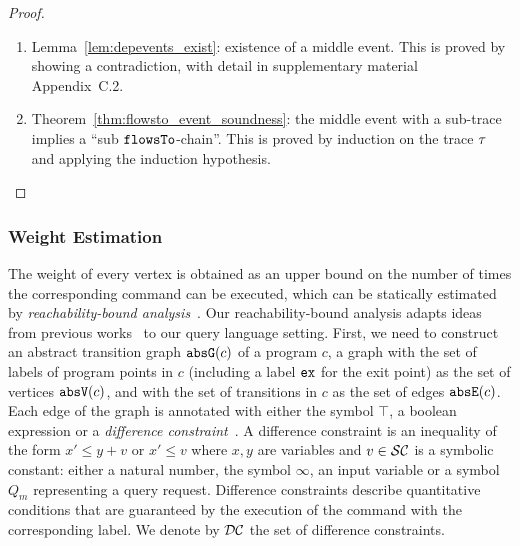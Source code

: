 {\begin{proof}
\begin{thm}
  \end{thm}
\begin{enumerate}
  \item Lemma~\ref{lem:depevents_exist}: existence of a middle event. 
  This is proved by showing a contradiction, with detail in supplementary material Appendix~C.2.%
  \item Theorem~\ref{thm:flowsto_event_soundness}: the middle event with a sub-trace implies a ``sub $\mathtt{flowsTo}$-chain''. 
  This is proved by induction on the trace $\mathtt{\tau}$ and applying the induction hypothesis.
\end{enumerate}
\end{proof}
}
\subsubsection{Weight Estimation}
\label{sec:alg_weightgen}

The weight of every vertex is obtained as an upper bound on 
the number of times the corresponding command can be executed,
which can be statically estimated by \emph{reachability-bound analysis}~\cite{GulwaniZ10}.
Our reachability-bound analysis adapts ideas from previous works~\cite{ZulegerGSV11,SinnZV14,sinn2017complexity} 
to our query language setting. First, we need to 
construct an abstract transition graph $\mathtt{abs}{\mathtt{G}}(c)$ of a program $c$, a
graph with the set of labels of program points in $c$  (including a 
label $\mathtt{ex}$ for the exit point) as the set of
vertices $\mathtt{abs}{\mathtt{V}}(c)$, and with the set of transitions in $c$ as the set of
edges $\mathtt{abs}{\mathtt{E}}(c)$. Each edge of the graph is annotated with either
the symbol $\top$, a boolean expression or a \emph{difference
constraint}~\cite{sinn2017complexity}. A difference constraint is an
inequality of the form $x' \leq y + v$ {or $x' \leq v$}
where $x, y$ are variables and $v \in \mathcal{SC}$ is a symbolic
constant: either a natural number, the symbol $\infty$, an input
variable or a symbol $Q_m$ representing a query request. Difference constraints describe
quantitative conditions that are guaranteed by the execution of the command with
the corresponding label. We denote by
$\mathcal{DC}$ the set of difference constraints.
%

